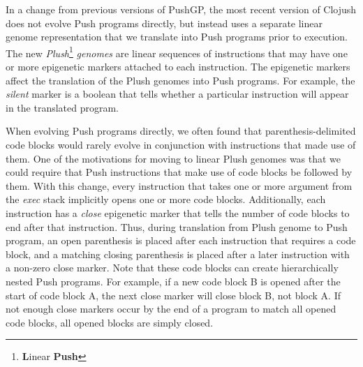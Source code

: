 In a change from previous versions of PushGP, the most recent version of Clojush does not evolve Push programs directly, but instead uses a separate linear genome representation that we translate into Push programs prior to execution. The new \textit{Plush}\footnote{\textbf{L}inear \textbf{Push}} \textit{genomes} are linear sequences of instructions that may have one or more epigenetic markers attached to each instruction. The epigenetic markers affect the translation of the Plush genomes into Push programs. For example, the \textit{silent} marker is a boolean that tells whether a particular instruction will appear in the translated program. 

When evolving Push programs directly, we often found that parenthesis-delimited code blocks would rarely evolve in conjunction with instructions that made use of them. One of the motivations for moving to linear Plush genomes was that we could require that Push instructions that make use of code blocks be followed by them. With this change, every instruction that takes one or more argument from the \textit{exec} stack implicitly opens one or more code blocks. Additionally, each instruction has a \textit{close} epigenetic marker that tells the number of code blocks to end after that instruction. Thus, during translation from Plush genome to Push program, an open parenthesis is placed after each instruction that requires a code block, and a matching closing parenthesis is placed after a later instruction with a non-zero close marker. Note that these code blocks can create hierarchically nested Push programs. For example, if a new code block B is opened after the start of code block A, the next close marker will close block B, not block A. If not enough close markers occur by the end of a program to match all opened code blocks, all opened blocks are simply closed.

